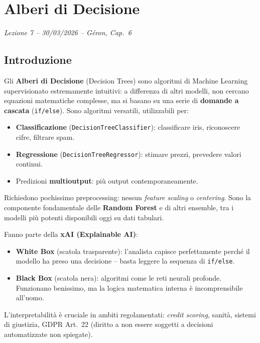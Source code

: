 \chapter{Alberi di Decisione}
\begin{flushright}\small\textit{Lezione 7 -- 30/03/2026 -- G\'eron, Cap.\ 6}\end{flushright}

\section{Introduzione}

Gli \textbf{Alberi di Decisione} (Decision Trees) sono algoritmi di Machine Learning supervisionato estremamente intuitivi: a differenza di altri modelli, non cercano equazioni matematiche complesse, ma si basano su una serie di \textbf{domande a cascata} (\texttt{if/else}). Sono algoritmi versatili, utilizzabili per:

\begin{itemize}
    \item \textbf{Classificazione} (\texttt{DecisionTreeClassifier}): classificare iris, riconoscere cifre, filtrare spam.
    \item \textbf{Regressione} (\texttt{DecisionTreeRegressor}): stimare prezzi, prevedere valori continui.
    \item Predizioni \textbf{multioutput}: più output contemporaneamente.
\end{itemize}

Richiedono pochissimo preprocessing: nessun \emph{feature scaling} o \emph{centering}. Sono la componente fondamentale delle \textbf{Random Forest} e di altri ensemble, tra i modelli più potenti disponibili oggi su dati tabulari.

Fanno parte della \textbf{xAI (Explainable AI)}:
\begin{itemize}
    \item \textbf{White Box} (scatola trasparente): l'analista capisce perfettamente perché il modello ha preso una decisione -- basta leggere la sequenza di \texttt{if/else}.
    \item \textbf{Black Box} (scatola nera): algoritmi come le reti neurali profonde. Funzionano benissimo, ma la logica matematica interna è incomprensibile all'uomo.
\end{itemize}

L'interpretabilità è cruciale in ambiti regolamentati: \emph{credit scoring}, sanità, sistemi di giustizia, GDPR Art.\ 22 (diritto a non essere soggetti a decisioni automatizzate non spiegate).

